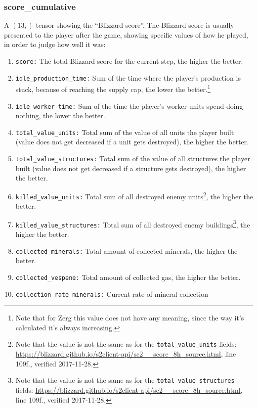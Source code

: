\documentclass{article}
\begin{document}
\subsubsection{score\_cumulative}
A $(13,)$ tensor showing the ``Blizzard score''. The Blizzard score is usually 
presented to the player after the game, showing specific values of how he 
played, in order to judge how well it was:
\begin{enumerate}[noitemsep,start=0]
\item \texttt{score:} The total Blizzard score for the current step, the higher 
the better.
\item \texttt{idle\_production\_time:} Sum of the time where the player's 
production is stuck, because of reaching the supply cap, the lower the 
better.\footnote{Note that for Zerg this value does not have any meaning, since 
the way it's calculated it's always increasing.}
\item \texttt{idle\_worker\_time:} Sum of the time the player's worker units 
spend doing nothing, the lower the better.
\item \texttt{total\_value\_units:} Total sum of the value of all units the 
player built (value does not get decreased if a unit gets destroyed), the 
higher the better.
\item \texttt{total\_value\_structures:} Total sum of the value of all 
structures the player built (value does not get decreased if a structure gets 
destroyed), the higher the better.
\item \texttt{killed\_value\_units:} Total sum of all destroyed enemy 
units\footnote{Note that the value is not the same as for the 
\texttt{total\_value\_units} fields: 
\url{https://blizzard.github.io/s2client-api/sc2\_\_score\_8h\_source.html}, 
line 109f., verified 2017-11-28.}, the higher the better.
\item \texttt{killed\_value\_structures:} Total sum of all destroyed enemy 
buildings\footnote{Note that the value is not the same as for the 
\texttt{total\_value\_structures} fields: 
\url{https://blizzard.github.io/s2client-api/sc2\_\_score\_8h\_source.html}, 
line 109f., verified 2017-11-28.}, the higher the better.
\item \texttt{collected\_minerals:} Total amount of collected minerals, the 
higher the better.
\item \texttt{collected\_vespene:} Total amount of collected gas, the higher 
the better.
\item \texttt{collection\_rate\_minerals:} Current rate of mineral collection 

\end{enumerate}
\end{document}
